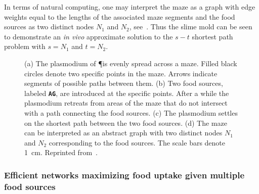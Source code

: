 			In terms of natural computing, one may interpret the maze as a graph with edge weights equal to the lengths of the associated maze segments and the food sources as two distinct nodes $N_1$ and $N_2$, see~. Thus the slime mold \Pp can be seen to demonstrate an \emph{in vivo} approximate solution to the $s-t$ shortest path problem with $s=N_1$ and $t=N_2$. 

			\begin{figure}
				\centering
				\newline
				
				\caption[Classic maze experiment with \P]{ (a) The plasmodium of 
				\P is evenly spread across a maze. Filled black circles denote two specific points in the maze. Arrows indicate segments of possible paths between them. (b) Two food sources, labeled \textbf{\texttt{AG}}, are introduced at the specific points. After a while the plasmodium retreats from areas of the maze that do not intersect with a path connecting the food sources. (c) The plasmodium settles on the shortest path between the two food sources. (d) The maze can be interpreted as an abstract graph with two distinct nodes $N_1$ and $N_2$ corresponding to the food sources. The scale bars denote \SI{1}{\centi\metre}. Reprinted from~\cite{Tero2007553}.}
				\label{fig:maze}
			\end{figure}

			\FloatBarrier

		\subsubsection{Efficient networks maximizing food uptake given multiple food sources}

